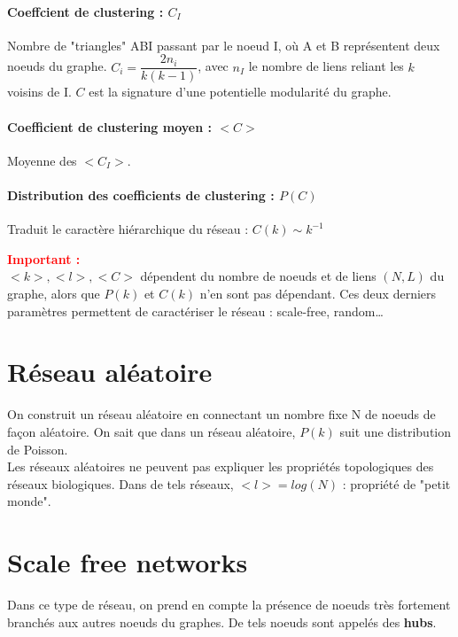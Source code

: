 \paragraph*{Coeffcient de clustering : $C_I$\\}
Nombre de "triangles" ABI passant par le noeud I, où A et B représentent deux noeuds du graphe. $C_i = \dfrac{2n_i}{k(k-1)}$, avec $n_I$ le nombre de liens reliant les $k$ voisins de I. $C$ est la signature d'une potentielle modularité du graphe.

\paragraph*{Coefficient de clustering moyen : $<C>$\\}
Moyenne des $<C_I>$.

\paragraph*{Distribution des coefficients de clustering : $P(C)$\\}
Traduit le caractère hiérarchique du réseau : $C(k) \sim k^{-1}$

\medskip
\raggedright
\textbf{\textcolor{red}{Important : }}\\
$<k>, <l>, <C>$ dépendent du nombre de noeuds et de liens $(N,L)$ du graphe, alors que $P(k)$ et $C(k)$ n'en sont pas dépendant. Ces deux derniers paramètres permettent de caractériser le réseau : scale-free, random\ldots

\section{Réseau aléatoire}
On construit un réseau aléatoire en connectant un nombre fixe N de noeuds de façon aléatoire.
On sait que dans un réseau aléatoire, $P(k)$ suit une distribution de Poisson. \\
Les réseaux aléatoires ne peuvent pas expliquer les propriétés topologiques des réseaux biologiques. Dans de tels réseaux, $<l> = log(N)$ : propriété de "petit monde". 

\section{Scale free networks}
Dans ce type de réseau, on prend en compte la présence de noeuds très fortement branchés aux autres noeuds du graphes. De tels noeuds sont appelés des \textbf{hubs}. 

